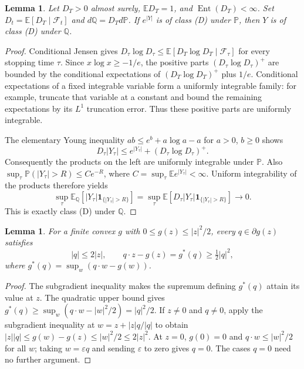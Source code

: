 \documentclass[11pt]{article}
\newtheorem{lemma}[theorem]{Lemma}
\newcommand{\E}{\mathbb E}
\newcommand{\Prb}{\mathbb P}
\newcommand{\Q}{\mathbb Q}
\newcommand{\F}{\mathcal F}
\newcommand{\Ind}{\mathbf 1}
\DeclareMathOperator{\Ent}{Ent}
\begin{document}
\begin{lemma}\label{transfer}
Let $D_T>0$ almost surely, $\E D_T=1$, and $\Ent(D_T)<\infty$.
Set $D_t=\E[D_T\mid\F_t]$ and $d\Q=D_Td\Prb$.
If $e^{|Y|}$ is of class (D) under $\Prb$, then $Y$ is of class (D)
under $\Q$.
\end{lemma}
\begin{proof}
Conditional Jensen gives
$D_\tau\log D_\tau\leq\E[D_T\log D_T\mid\F_\tau]$ for every
stopping time $\tau$. Since $x\log x\geq-1/e$, the positive parts
$(D_\tau\log D_\tau)^+$ are bounded by the conditional expectations of
$(D_T\log D_T)^+$ plus $1/e$. Conditional expectations of a fixed
integrable variable form a uniformly integrable family: for example,
truncate that variable at a constant and bound the remaining expectations
by its $L^1$ truncation error. Thus these positive parts are uniformly
integrable.

The elementary Young inequality $ab\leq e^b+a\log a-a$ for
$a>0$, $b\geq0$ shows
\[
 D_\tau|Y_\tau|\leq e^{|Y_\tau|}+(D_\tau\log D_\tau)^+.
\]
Consequently the products on the left are uniformly integrable under
$\Prb$. Also $\sup_\tau\Prb(|Y_\tau|>R)\leq C e^{-R}$, where
$C=\sup_\tau\E e^{|Y_\tau|}<\infty$.
Uniform integrability of the products therefore yields
\[
 \sup_\tau\E_\Q[|Y_\tau|\Ind_{\{|Y_\tau|>R\}}]
 =\sup_\tau\E[D_\tau|Y_\tau|\Ind_{\{|Y_\tau|>R\}}]\longrightarrow0.
\]
This is exactly class (D) under $\Q$.
\end{proof}

\begin{lemma}\label{subgrad}
For a finite convex $g$ with $0\leq g(z)\leq|z|^2/2$,
every $q\in\partial g(z)$ satisfies
\[
 |q|\leq2|z|,\qquad q\cdot z-g(z)=g^*(q)\geq\tfrac12|q|^2,
\]
where $g^*(q)=\sup_w(q\cdot w-g(w))$.
\end{lemma}
\begin{proof}
The subgradient inequality makes the supremum defining $g^*(q)$ attain
its value at $z$. The quadratic upper bound gives
$g^*(q)\geq\sup_w(q\cdot w-|w|^2/2)=|q|^2/2$.
If $z\ne0$ and $q\ne0$, apply the subgradient inequality at
$w=z+|z|q/|q|$ to obtain
$|z||q|\leq g(w)-g(z)\leq|w|^2/2\leq2|z|^2$.
At $z=0$, $g(0)=0$ and $q\cdot w\leq|w|^2/2$ for all $w$;
taking $w=\varepsilon q$ and sending $\varepsilon$ to zero gives $q=0$.
The cases $q=0$ need no further argument.
\end{proof}
\end{document}
